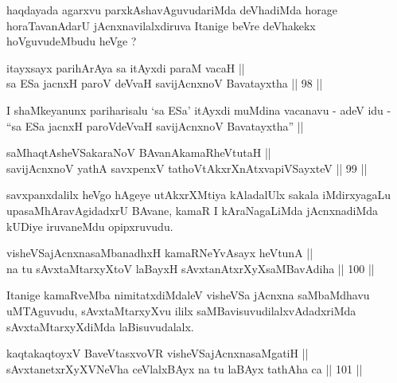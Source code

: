 \begin{artha}
haqdayada agarxvu parxkAshavAguvudariMda deVhadiMda horage
horaTavanAdarU jAcnxnavilalxdiruva Itanige beVre deVhakekx
hoVguvudeMbudu heVge ?
\end{artha}


\begin{shl}
itayxsayx parihArAya sa itAyxdi paraM vacaH || \\
sa ESa jacnxH paroV deVvaH savijAcnxnoV Bavatayxtha \hfill || 98 ||  
\end{shl}

\begin{artha}
I shaMkeyanunx pariharisalu `sa ESa' itAyxdi muMdina vacanavu - adeV
idu - ``sa ESa jacnxH paroVdeVvaH savijAcnxnoV Bavatayxtha'' || 
\end{artha}


\begin{shl}
saMhaqtAsheVSakaraNoV BAvanAkamaRheVtutaH || \\
savijAcnxnoV yathA savxpenxV tathoVtAkxrXnAtxvapiVSayxteV \hfill || 99 ||  
\end{shl}

\begin{artha}
savxpanxdalilx heVgo hAgeye utAkxrXMtiya kAladalUlx sakala
iMdirxyagaLu upasaMhAravAgidadxrU BAvane, kamaR I kAraNagaLiMda
jAcnxnadiMda kUDiye iruvaneMdu opipxruvudu.
\end{artha}


\begin{shl}
visheVSajAcnxnasaMbanadhxH kamaRNeYvAsayx heVtunA || \\
na tu sAvxtaMtarxyXtoV laBayxH sAvxtanAtxrXyXsaMBavAdiha \hfill || 100 ||  
\end{shl}

\begin{artha}
Itanige kamaRveMba nimitatxdiMdaleV visheVSa jAcnxna saMbaMdhavu
uMTAguvudu, sAvxtaMtarxyXvu ililx saMBavisuvudilalxvAdadxriMda
sAvxtaMtarxyXdiMda laBisuvudalalx.
\end{artha}


\begin{shl}
kaqtakaqtoyxV BaveVtasxvoVR visheVSajAcnxnasaMgatiH || \\
sAvxtanetxrXyXVNeVha ceVlalxBAyx na tu laBAyx tathA\s \s ha ca \hfill || 101 || 
\end{shl}

